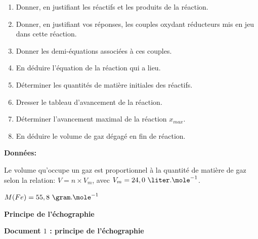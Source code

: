\begin{enumerate}
\item Donner, en justifiant les réactifs et les produits de la réaction.
\item Donner, en justifiant vos réponses, les couples oxydant réducteurs mis en jeu dans cette réaction.
\item  Donner les demi-équations associées à ces couples.
\item En déduire l'équation de la réaction qui a lieu.
\item Déterminer les quantités de matière initiales des réactifs.
\item Dresser le tableau d'avancement de la réaction.
\item Déterminer l'avancement maximal de la réaction $x_{max}$.
\item En déduire le volume de gaz dégagé en fin de réaction.
\end{enumerate}

\vspace{0.3cm}

\textbf{Données:}

\vspace{0.3cm}

Le volume qu'occupe un gaz est proportionnel à la quantité de matière de gaz selon la relation: $V = n \times V_{m}$, avec $V_{m} = 24,0\text{ }\liter.\mole^{-1}$.

\vspace{0.3cm}

$M(Fe) = 55,8\text{ }\gram.\mole^{-1}$

\newpage


\exo \textbf{Principe de l'échographie}

\vspace{0.3cm}

\textbf{Document $1$ : principe de l'échographie}

\vspace{0.3cm}


